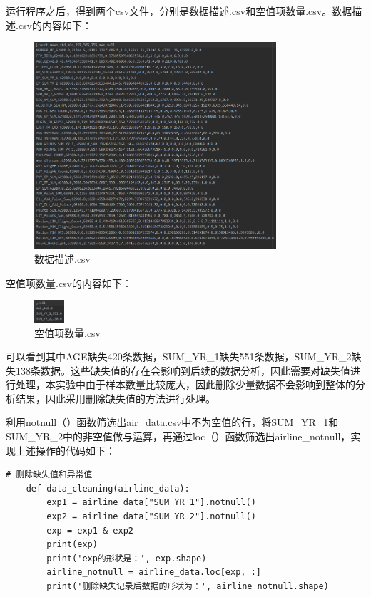 \documentclass[UTF8,12pt]{article}
\begin{document}
运行程序之后，得到两个csv文件，分别是数据描述.csv和空值项数量.csv。数据描述.csv的内容如下：

\begin{figure}[htbp]
    \centering
    \includegraphics[width=0.8\textwidth]{img/4.png}
    \caption{数据描述.csv}
\end{figure}

空值项数量.csv的内容如下：

\begin{figure}[htbp]
    \centering
    \includegraphics[width=0.1\textwidth]{img/5.png}
    \caption{空值项数量.csv}
\end{figure}

可以看到其中AGE缺失420条数据，SUM\_YR\_1缺失551条数据，SUM\_YR\_2缺失138条数据。这些缺失值的存在会影响到后续的数据分析，因此需要对缺失值进行处理，本实验中由于样本数量比较庞大，因此删除少量数据不会影响到整体的分析结果，因此采用删除缺失值的方法进行处理。

利用notnull（）函数筛选出air\_data.csv中不为空值的行，将SUM\_YR\_1和SUM\_YR\_2中的非空值做与运算，再通过loc（）函数筛选出airline\_notnull，实现上述操作的代码如下：

\begin{lstlisting}[title=删除缺失值,frame=shadowbox]
    # 删除缺失值和异常值
    def data_cleaning(airline_data):
        exp1 = airline_data["SUM_YR_1"].notnull()
        exp2 = airline_data["SUM_YR_2"].notnull()
        exp = exp1 & exp2
        print(exp)
        print('exp的形状是：', exp.shape)
        airline_notnull = airline_data.loc[exp, :]
        print('删除缺失记录后数据的形状为：', airline_notnull.shape)
\end{lstlisting}
\end{document}
